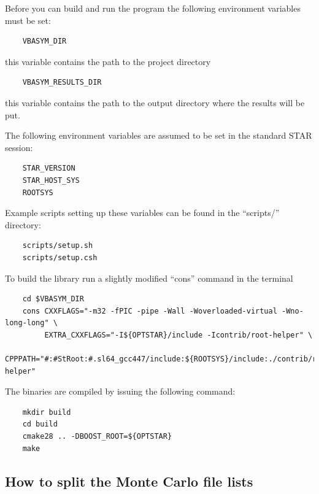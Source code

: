 \documentclass[12pt]{article}
\begin{document}

Before you can build and run the program the following environment variables must
be set:

\begin{lstlisting}
    VBASYM_DIR      
\end{lstlisting}  
this variable contains the path to the project directory 
\begin{lstlisting}  
    VBASYM_RESULTS_DIR
\end{lstlisting}
this variable contains the path to the output directory where the results will be put.

The following environment variables are assumed to be set in the standard STAR
session:

\begin{lstlisting}
    STAR_VERSION
    STAR_HOST_SYS
    ROOTSYS
\end{lstlisting}

Example scripts setting up these variables can be found in the ``scripts/''
directory:

\begin{lstlisting}
    scripts/setup.sh
    scripts/setup.csh
\end{lstlisting}

To build the library run a slightly modified ``cons'' command in the terminal

\begin{lstlisting}
    cd $VBASYM_DIR
    cons CXXFLAGS="-m32 -fPIC -pipe -Wall -Woverloaded-virtual -Wno-long-long" \
         EXTRA_CXXFLAGS="-I${OPTSTAR}/include -Icontrib/root-helper" \
         CPPPATH="#:#StRoot:#.sl64_gcc447/include:${ROOTSYS}/include:./contrib/root-helper"
\end{lstlisting}

The binaries are compiled by issuing the following command:

\begin{lstlisting}
    mkdir build
    cd build
    cmake28 .. -DBOOST_ROOT=${OPTSTAR}
    make
\end{lstlisting}

\subsection{How to split the Monte Carlo file lists}
\end{document}
